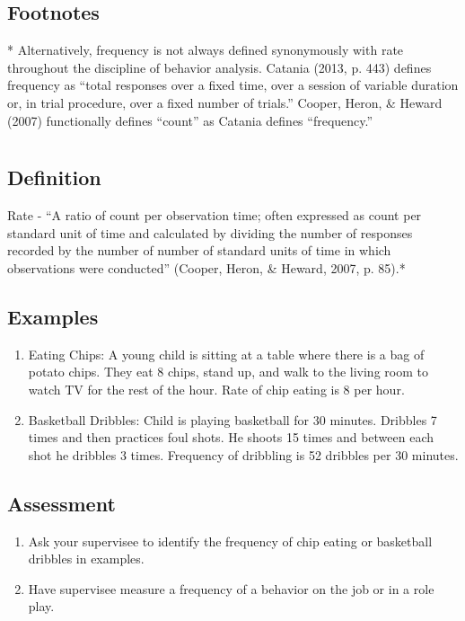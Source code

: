 \subsection{Footnotes}
* Alternatively, frequency is not always defined synonymously with rate throughout the discipline of behavior analysis. Catania (2013, p. 443) defines frequency as ``total responses over a fixed time, over a session of variable duration or, in trial procedure, over a fixed number of trials.'' Cooper, Heron, \& Heward (2007) functionally defines ``count'' as Catania defines ``frequency.''
%
\clearpage \section{\fouraTwo{}}
%
%
\subsection{Definition}
Rate - ``A ratio of count per observation time; often expressed as count per standard unit of time and calculated by dividing the number of responses recorded by the number of number of standard units of time in which observations were conducted'' (Cooper, Heron, \& Heward, 2007, p. 85).*
%
\subsection{Examples}
\begin{enumerate}
\item    Eating Chips: A young child is sitting at a table where there is a bag of potato chips. They eat 8 chips, stand up, and walk to the living room to watch TV for the rest of the hour. Rate of chip eating is 8 per hour.
\item Basketball Dribbles: Child is playing basketball for 30 minutes. Dribbles 7 times and then practices foul shots. He shoots 15 times and between each shot he dribbles 3 times. Frequency of dribbling is 52 dribbles per 30 minutes.
\end{enumerate}

\subsection{Assessment} 
\begin{enumerate}
\item Ask your supervisee to identify the frequency of chip eating or basketball dribbles in examples.
\item Have supervisee measure a frequency of a behavior on the job or in a role play.
\end{enumerate}
%
